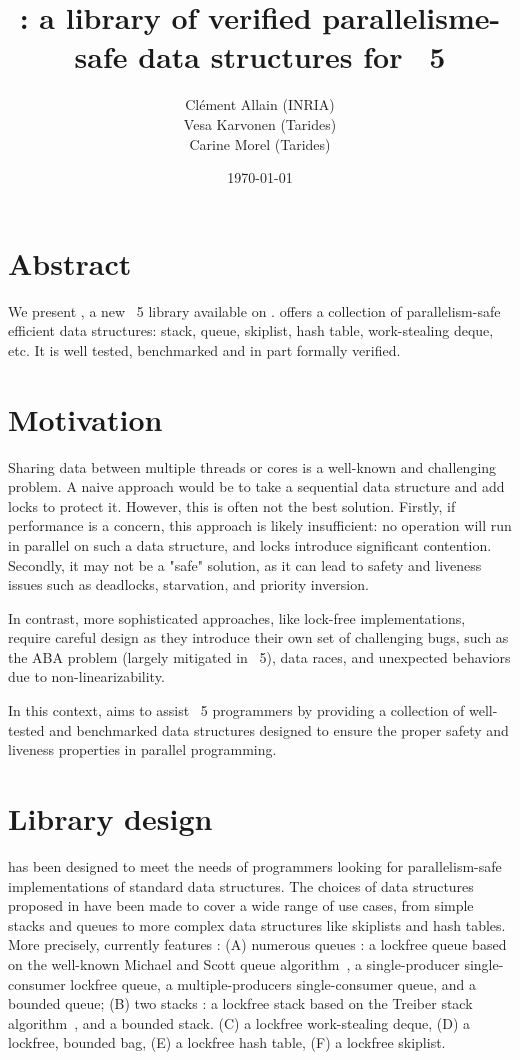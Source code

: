 \documentclass[a4paper, 11pt]{article}
\title{\Saturn: a library of verified parallelisme-safe data structures for \OCaml~5}
\date{\today}
\author{
  Clément Allain (INRIA) \\
  Vesa Karvonen (Tarides) \\
  Carine Morel (Tarides)
}
\begin{document}
\maketitle

\section{Abstract}

We present \Saturn, a new \OCaml~5 library available on \opam.
\Saturn offers a collection of parallelism-safe efficient data structures: stack, queue, skiplist, hash table, work-stealing deque, etc.
It is well tested, benchmarked and in part formally verified.

\section{Motivation}

Sharing data between multiple threads or cores is a well-known and challenging problem. A naive approach would be to take a sequential data structure and add locks to protect it. However, this is often not the best solution. Firstly, if performance is a concern, this approach is likely insufficient: no operation will run in parallel on such a data structure, and locks introduce significant contention. Secondly, it may not be a "safe" solution, as it can lead to safety and liveness issues such as deadlocks, starvation, and priority inversion.

In contrast, more sophisticated approaches, like lock-free implementations, require careful design as they introduce their own set of challenging bugs, such as the ABA problem (largely mitigated in \OCaml~5), data races, and unexpected behaviors due to non-linearizability.

In this context, \Saturn aims to assist \OCaml~5 programmers by providing a collection of well-tested and benchmarked data structures designed to ensure the proper safety and liveness properties in parallel programming.

\section{Library design}

\Saturn has been designed to meet the needs of programmers looking for parallelism-safe implementations of standard data structures. The choices of data structures proposed in have been made to cover a wide range of use cases, from simple stacks and queues to more complex data structures like skiplists and hash tables.  More precisely, \Saturn currently features : 
(A) numerous queues : a lockfree queue based on the well-known Michael and Scott queue algorithm~\cite{michael1996simple}, a single-producer single-consumer lockfree queue, a multiple-producers single-consumer queue, and a bounded queue; 
(B) two stacks : a lockfree stack based on the Treiber stack algorithm~\cite{treiber1986systems}, and a bounded stack. %
(C) a lockfree work-stealing deque,
(D) a lockfree, bounded bag,
(E) a lockfree hash table, 
(F) a lockfree skiplist.
\end{document}

